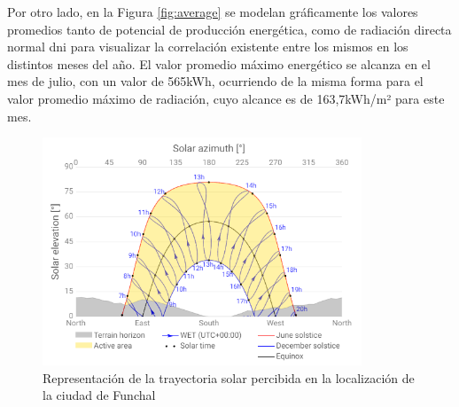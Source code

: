 Por otro lado, en la Figura \ref{fig:average} se modelan gráficamente los valores promedios tanto de potencial de producción energética, como de radiación directa normal \gls{dni} para visualizar la correlación existente entre los mismos en los distintos meses del año. El valor promedio máximo energético se alcanza en el mes de julio, con un valor de 565kWh, ocurriendo de la misma forma para el valor promedio máximo de radiación, cuyo alcance es de 163,7kWh/m² para este mes.

\begin{figure}[H]
    \centering
    \includegraphics[width=0.85\textwidth]{img/diseno/azimut.png}
    \caption{Representación de la trayectoria solar percibida en la localización de la ciudad de Funchal \cite{globalsolar}}
    \label{fig:azimut}
\end{figure}

\vspace{3mm}

